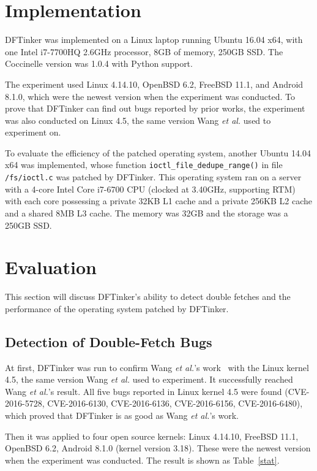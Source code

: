 \documentclass[10pt]{llncs}
\begin{document}
\section{Implementation}%
\label{imple}
DFTinker was implemented on a Linux laptop running Ubuntu 16.04 x64, with one Intel i7-7700HQ 2.6GHz processor, 8GB of memory, 250GB SSD. The Coccinelle version was 1.0.4 with Python support.

The experiment used Linux 4.14.10, OpenBSD 6.2, FreeBSD 11.1, and Android 8.1.0, which were the newest version when the experiment was conducted. To prove that DFTinker can find out bugs reported by prior works, the experiment was also conducted on Linux 4.5, the same version Wang \textit{et al.} used to experiment on.

To evaluate the efficiency of the patched operating system, another Ubuntu 14.04 x64 was implemented, whose function \verb:ioctl_file_dedupe_range(): in file \texttt{/fs/ioctl.c} was patched by DFTinker. This operating system ran on a server with a 4-core Intel Core i7-6700 CPU (clocked at 3.40GHz, supporting RTM) with each core possessing a private 32KB L1 cache and a private 256KB L2 cache and a shared 8MB L3 cache. The memory was 32GB and the storage was a 250GB SSD.

\section{Evaluation}%
\label{evalue}
This section will discuss DFTinker's ability to detect double fetches and the performance of the operating system patched by DFTinker.
\subsection{Detection of Double-Fetch Bugs}
\label{evalue1}


At first, DFTinker was run to confirm Wang \textit{et al.}'s work~\cite{wang} with the Linux kernel 4.5, the same version Wang \textit{et al.} used to experiment. It successfully reached Wang \textit{et al.}'s result. All five bugs reported in Linux kernel 4.5 were found (CVE-2016-5728, CVE-2016-6130, CVE-2016-6136, CVE-2016-6156, CVE-2016-6480), which proved that DFTinker is as good as Wang \textit{et al.}'s work.

Then it was applied to four open source kernels: Linux 4.14.10, FreeBSD 11.1, OpenBSD 6.2, Android 8.1.0 (kernel version 3.18). These were the newest version when the experiment was conducted. The result is shown as Table~\ref{stat}.
\end{document}
